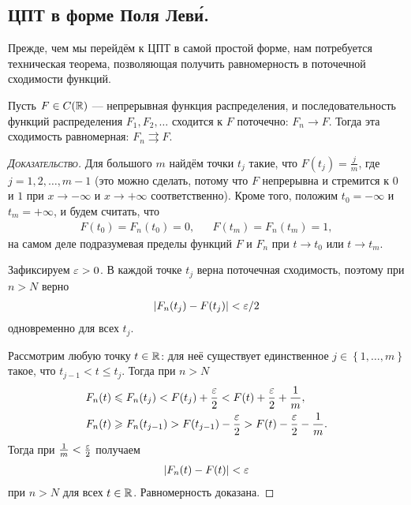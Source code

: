 \documentclass[../main.tex]{subfiles}
\begin{document}
\subsection{ЦПТ в форме Поля Лев\'{и}.}

Прежде, чем мы перейдём к ЦПТ в самой простой форме, нам потребуется техническая теорема, позволяющая получить равномерность в поточечной сходимости функций.

\begin{thm}
 \label{theorem:even_weak_convergence_to_continuous_distr_func}
 Пусть $ F \in C(\mathbb{R})$ --- непрерывная функция распределения, и последовательность функций распределения $ F_1, F_2, \ldots $ сходится к $ F $ поточечно: $ F_n \to F $. Тогда эта сходимость равномерная: $ F_n \rightrightarrows F $.
\end{thm}
\begin{proof}[\normalfont\textsc{Доказательство}]
 Для большого $ m $ найдём точки $ t_j $ такие, что $ F(t_j) = \frac{j}{m} $, где $ j = 1, 2, \ldots, m - 1 $ (это можно сделать, потому что $ F $ непрерывна и стремится к $ 0 $ и $ 1 $ при $ x \to -\infty $ и $ x \to +\infty $ соответственно). Кроме того, положим $ t_0 = -\infty $ и $ t_m = +\infty $, и будем считать, что
 \begin{align*}
  F(t_0) = F_n(t_0) = 0, && F(t_m) = F_n(t_m) = 1,
 \end{align*} на самом деле подразумевая пределы функций $ F $ и $ F_n $ при $ t \to t_0 $ или $ t \to t_m $.

 Зафиксируем $ \varepsilon > 0 $. В каждой точке $ t_j $ верна поточечная сходимость, поэтому при $ n > N $ верно
 \begin{align*}
  \left| F_n(t_j) - F(t_j) \right| < \varepsilon / 2
 \end{align*} одновременно для всех $ t_j $.

 Рассмотрим любую точку $ t \in \mathbb{R} $: для неё существует единственное $ j \in \left\{ 1,\ldots,m \right\} $ такое, что $ t_{j-1} < t \leqslant t_j $. Тогда при $ n > N $
 \begin{align*}
  F_n(t) &\leqslant F_n(t_j) < F(t_j) + \frac{\varepsilon}{2} < F(t) + \frac{\varepsilon}{2} + \frac{1}{m},\\
  F_n(t) &\geqslant F_n(t_{j-1}) > F(t_{j-1}) - \frac{\varepsilon}{2} > F(t) - \frac{\varepsilon}{2} - \frac{1}{m}.
 \end{align*} Тогда при $ \frac{1}{m} < \frac{\varepsilon}{2} $ получаем
 \begin{align*}
  \left| F_n(t)-F(t) \right| < \varepsilon
 \end{align*} при $ n > N $ для всех $ t \in \mathbb{R} $. Равномерность доказана.
\end{proof}
\end{document}
